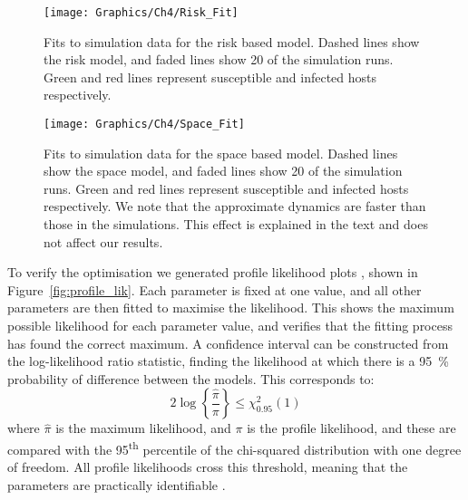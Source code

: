 \begin{figure}
    \begin{center}
        \texttt{[image: Graphics/Ch4/Risk\_Fit]}
        \caption[Risk based approximate model fitted to the network model]{Fits to simulation data for the risk based model. Dashed lines show the risk model, and faded lines show 20 of the simulation runs. Green and red lines represent susceptible and infected hosts respectively.}
        \label{fig:risk_fit}
    \end{center}
\end{figure}

\begin{figure}[h]
    \begin{center}
        \texttt{[image: Graphics/Ch4/Space\_Fit]}
        \caption[Space based approximate model fitted to the network model]{Fits to simulation data for the space based model. Dashed lines show the space model, and faded lines show 20 of the simulation runs. Green and red lines represent susceptible and infected hosts respectively. We note that the approximate dynamics are faster than those in the simulations. This effect is explained in the text and does not affect our results.\label{fig:space_fit}}
    \end{center}
\end{figure}

To verify the optimisation we generated profile likelihood plots \citep{bolker_ecological_2008}, shown in Figure~\ref{fig:profile_lik}. Each parameter is fixed at one value, and all other parameters are then fitted to maximise the likelihood. This shows the maximum possible likelihood for each parameter value, and verifies that the fitting process has found the correct maximum. A confidence interval can be constructed from the log-likelihood ratio statistic, finding the likelihood at which there is a \SI{95}{\percent} probability of difference between the models. This corresponds to:
\begin{equation}
    2\log\left\{\frac{\hat{\pi}}{\pi}\right\} \leq \chi^2_{0.95}(1)
\end{equation}
where $\hat{\pi}$ is the maximum likelihood, and $\pi$ is the profile likelihood, and these are compared with the 95\textsuperscript{th} percentile of the chi-squared distribution with one degree of freedom. All profile likelihoods cross this threshold, meaning that the parameters are practically identifiable \citep{raue_structural_2009}.

